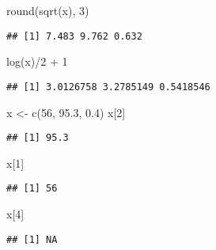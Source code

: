 \documentclass[
]{article}
\newenvironment{Shaded}{\begin{snugshade}}{\end{snugshade}}
\newcommand{\DecValTok}[1]{\textcolor[rgb]{0.00,0.00,0.81}{#1}}
\newcommand{\FloatTok}[1]{\textcolor[rgb]{0.00,0.00,0.81}{#1}}
\newcommand{\FunctionTok}[1]{\textcolor[rgb]{0.00,0.00,0.00}{#1}}
\newcommand{\NormalTok}[1]{#1}
\newcommand{\OtherTok}[1]{\textcolor[rgb]{0.56,0.35,0.01}{#1}}
\newcommand{\SpecialCharTok}[1]{\textcolor[rgb]{0.00,0.00,0.00}{#1}}
\begin{document}
\begin{Shaded}
\begin{Highlighting}[]
\FunctionTok{round}\NormalTok{(}\FunctionTok{sqrt}\NormalTok{(x), }\DecValTok{3}\NormalTok{)}
\end{Highlighting}
\end{Shaded}

\begin{verbatim}
## [1] 7.483 9.762 0.632
\end{verbatim}

\begin{Shaded}
\begin{Highlighting}[]
\FunctionTok{log}\NormalTok{(x)}\SpecialCharTok{/}\DecValTok{2} \SpecialCharTok{+} \DecValTok{1} 
\end{Highlighting}
\end{Shaded}

\begin{verbatim}
## [1] 3.0126758 3.2785149 0.5418546
\end{verbatim}

\begin{Shaded}
\begin{Highlighting}[]
\NormalTok{x }\OtherTok{\textless{}{-}} \FunctionTok{c}\NormalTok{(}\DecValTok{56}\NormalTok{, }\FloatTok{95.3}\NormalTok{, }\FloatTok{0.4}\NormalTok{)}
\NormalTok{x[}\DecValTok{2}\NormalTok{]}
\end{Highlighting}
\end{Shaded}

\begin{verbatim}
## [1] 95.3
\end{verbatim}

\begin{Shaded}
\begin{Highlighting}[]
\NormalTok{x[}\DecValTok{1}\NormalTok{]}
\end{Highlighting}
\end{Shaded}

\begin{verbatim}
## [1] 56
\end{verbatim}

\begin{Shaded}
\begin{Highlighting}[]
\NormalTok{x[}\DecValTok{4}\NormalTok{]}
\end{Highlighting}
\end{Shaded}

\begin{verbatim}
## [1] NA
\end{verbatim}
\end{document}
